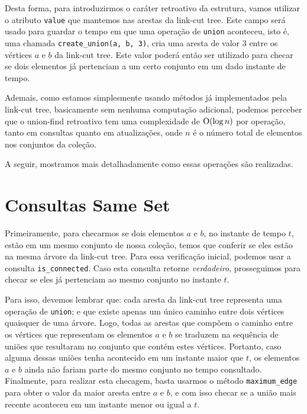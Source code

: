 Desta forma, para introduzirmos o caráter retroativo da estrutura, vamos utilizar o atributo \texttt{value} que mantemos nas arestas da link-cut tree. Este campo será usado para guardar o tempo em que uma operação de \texttt{union} aconteceu, isto é, uma chamada \texttt{create\_union(a, b, 3)}, cria uma aresta de valor $3$ entre os vértices $a$ e $b$ da link-cut tree. Este valor poderá então ser utilizado para checar se dois elementos já pertenciam a um certo conjunto em um dado instante de tempo.

Ademais, como estamos simplesmente usando métodos já implementados pela link-cut tree, basicamente sem nenhuma computação adicional, podemos perceber que o union-find retroativo tem uma complexidade de $\mathrm{O}(\log n)$ por operação, tanto em consultas quanto em atualizações, onde $n$ é o número total de elementos nos conjuntos da coleção.

A seguir, mostramos mais detalhadamente como essas operações são realizadas.

\section{Consultas Same Set}
\label{sec:uf-same-set}

Primeiramente, para checarmos se dois elementos $a$ e $b$, no instante de tempo $t$, estão em um mesmo conjunto de nossa coleção, temos que conferir se eles estão na mesma árvore da link-cut tree. Para essa verificação inicial, podemos usar a consulta \texttt{is\_connected}. Caso esta consulta retorne \emph{verdadeiro}, prosseguimos para checar se eles já pertenciam ao mesmo conjunto no instante $t$.

Para isso, devemos lembrar que: cada aresta da link-cut tree representa uma operação de \texttt{union}; e que existe apenas um único caminho entre dois vértices quaisquer de uma árvore. Logo, todas as arestas que compõem o caminho entre os vértices que representam os elementos $a$ e $b$ se traduzem na sequência de uniões que resultaram no conjunto que contém estes vértices. Portanto, caso alguma dessas uniões tenha acontecido em um instante maior que $t$, os elementos $a$ e $b$ ainda não fariam parte do mesmo conjunto no tempo consultado. Finalmente, para realizar esta checagem, basta usarmos o método \texttt{maximum\_edge} para obter o valor da maior aresta entre $a$ e $b$, e com isso checar se a união mais recente aconteceu em um instante menor ou igual a $t$.

